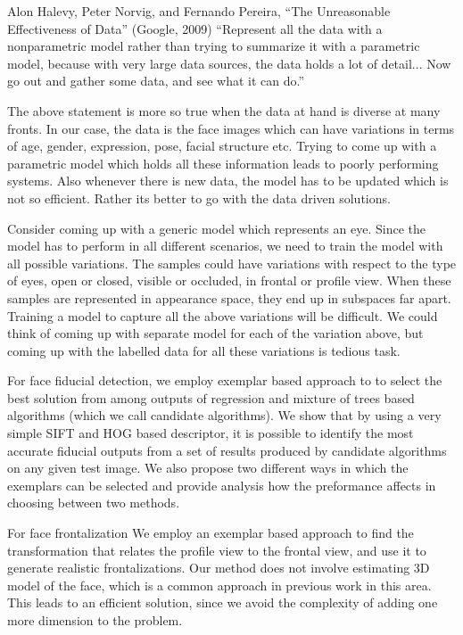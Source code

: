
\begin{chapquote}{
Alon Halevy, Peter Norvig, and Fernando Pereira,
“The Unreasonable Effectiveness of Data” (Google, 2009)
}
“Represent all the data with a nonparametric model rather than trying to
summarize it with a parametric model, because with very large data sources, the
data holds a lot of detail... Now go out and gather some data, and see what it can
do.”
\end{chapquote}

The above statement is more so true when the data at hand is diverse at many fronts. In our case, 
the data is the face images which can have variations in terms of age, gender, expression, pose, 
facial structure etc. Trying to come up with a parametric model which holds all these information
leads to poorly performing systems. Also whenever there is new data, the model has to be updated
which is not so efficient. Rather its better to go with the data driven solutions.

Consider coming up with a generic model which represents an eye. Since the model has to perform
in all different scenarios, we need to train the model with all possible variations. The samples
could have variations with respect to the type of eyes, open or closed, visible or occluded, in 
frontal or profile view. When these samples are represented in appearance space, they end up in 
subspaces far apart. Training a model to capture all the above variations will be difficult. We
could think of coming up with separate model for each of the variation above, but coming up with 
the labelled data for all these variations is tedious task. 

For face fiducial detection, we employ exemplar based approach to to select the best solution 
from among outputs of regression and mixture of trees based algorithms (which we call candidate 
algorithms). We show that by using a very simple SIFT and HOG based descriptor, it is possible to 
identify the most accurate fiducial outputs from a set of results produced by candidate algorithms 
on any given test image. We also propose two different ways in which the exemplars can be selected
and provide analysis how the preformance affects in choosing between two methods.

For face frontalization We employ an exemplar based approach to find the transformation that relates 
the profile view to the frontal view, and use it to generate realistic frontalizations. Our method 
does not involve estimating 3D model of the face, which is a common approach in previous work in 
this area. This leads to an efficient solution, since we avoid the complexity of adding one more 
dimension to the problem. 
